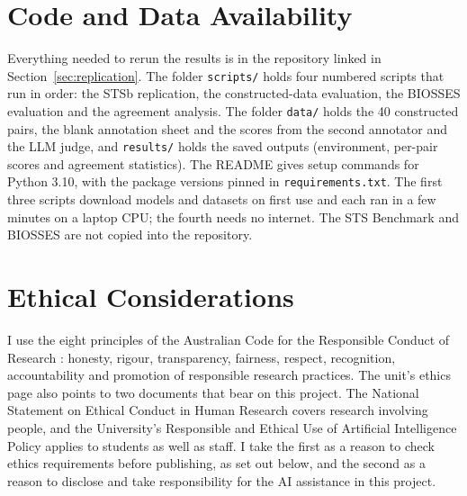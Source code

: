 \documentclass[11pt]{article}
\begin{document}
\section{Code and Data Availability}
\label{sec:code}

Everything needed to rerun the results is in the repository linked in Section~\ref{sec:replication}. The folder \texttt{scripts/} holds four numbered scripts that run in order: the STSb replication, the constructed-data evaluation, the BIOSSES evaluation and the agreement analysis. The folder \texttt{data/} holds the 40 constructed pairs, the blank annotation sheet and the scores from the second annotator and the LLM judge, and \texttt{results/} holds the saved outputs (environment, per-pair scores and agreement statistics). The README gives setup commands for Python 3.10, with the package versions pinned in \texttt{requirements.txt}. The first three scripts download models and datasets on first use and each ran in a few minutes on a laptop CPU; the fourth needs no internet. The STS Benchmark and BIOSSES are not copied into the repository.

\section{Ethical Considerations}
\label{sec:ethics}

I use the eight principles of the Australian Code for the Responsible Conduct of Research \citep{nhmrc2018code}: honesty, rigour, transparency, fairness, respect, recognition, accountability and promotion of responsible research practices. The unit's ethics page also points to two documents that bear on this project. The National Statement on Ethical Conduct in Human Research \citep{nhmrc2025national} covers research involving people, and the University's Responsible and Ethical Use of Artificial Intelligence Policy \citep{mqai2025policy} applies to students as well as staff. I take the first as a reason to check ethics requirements before publishing, as set out below, and the second as a reason to disclose and take responsibility for the AI assistance in this project.
\end{document}
